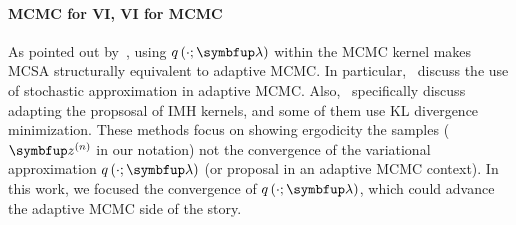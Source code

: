 \paragraph{MCMC for VI, VI for MCMC}
As pointed out by~\citet{pmlr-v124-ou20a}, using \(q\left(\cdot; \vlambda\right)\) within the MCMC kernel makes MCSA structurally equivalent to adaptive MCMC.
In particular,~\citet{10.1007/s11222-008-9110-y, garthwaite_adaptive_2016, pmlr-v151-brofos22a, gabrie_adaptive_2022} discuss the use of stochastic approximation in adaptive MCMC.
Also,~\citet{andrieu_ergodicity_2006, keith_adaptive_2008, holden_adaptive_2009, giordani_adaptive_2010, pmlr-v151-brofos22a, habib2018auxiliary, neklyudov_metropolishastings_2019} specifically discuss adapting the propsosal of IMH kernels, and some of them use KL divergence minimization.
These methods focus on showing ergodicity the samples (\(\vz^{(n)}\) in our notation) not the convergence of the variational approximation \(q\left(\cdot; \vlambda\right)\) (or proposal in an adaptive MCMC context).
In this work, we focused the convergence of \(q\left(\cdot; \vlambda\right)\), which could advance the adaptive MCMC side of the story.



